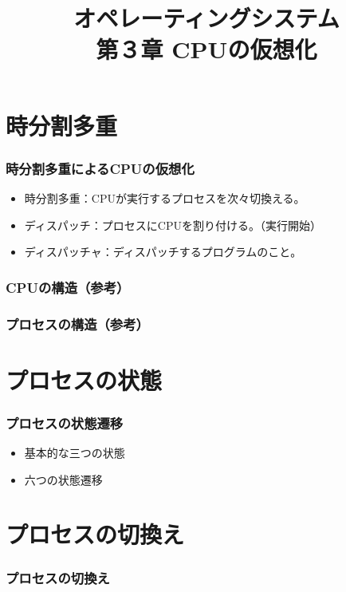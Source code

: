 \documentclass{beamer}                   %
\begin{document}
\title[OS]{オペレーティングシステム\\第３章 CPUの仮想化}
\date{}

\begin{frame}
  \titlepage
\end{frame}


\section{時分割多重}
\begin{frame}
  \frametitle{時分割多重によるCPUの仮想化}
  \begin{itemize}
    \item 時分割多重：CPUが実行するプロセスを次々切換える。
    \item ディスパッチ：プロセスにCPUを割り付ける。（実行開始）
    \item ディスパッチャ：ディスパッチするプログラムのこと。
  \end{itemize}
\end{frame}

\begin{frame}
  \frametitle{CPUの構造（参考）}
\end{frame}

\begin{frame}
  \frametitle{プロセスの構造（参考）}
\end{frame}

\section{プロセスの状態}
\begin{frame}
  \frametitle{プロセスの状態遷移}
  \begin{itemize}
    \item 基本的な三つの状態
    \item 六つの状態遷移
  \end{itemize}
\end{frame}

\section{プロセスの切換え}
\begin{frame}
  \frametitle{プロセスの切換え}
\end{frame}
\end{document}
